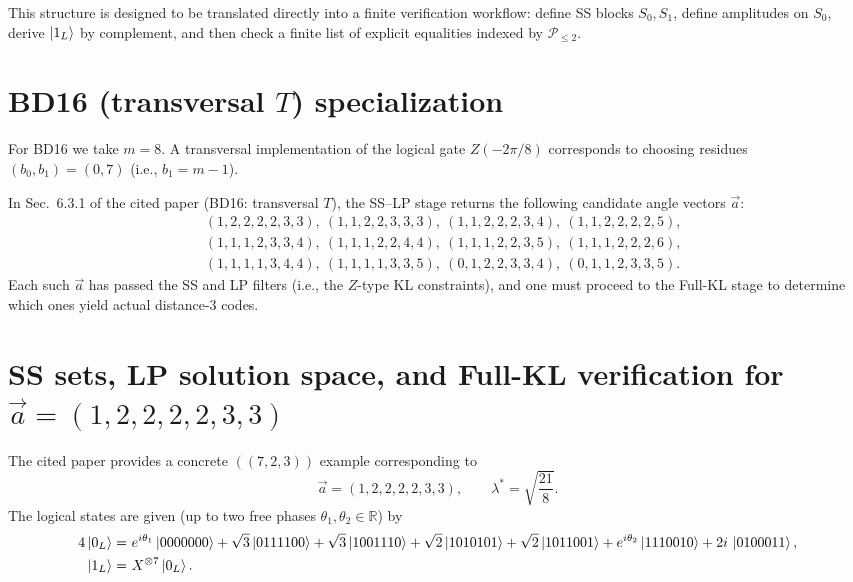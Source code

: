\documentclass[11pt]{article}
\begin{document}
\medskip
\noindent
This structure is designed to be translated directly into a finite verification workflow:
define SS blocks \(S_0,S_1\), define amplitudes on \(S_0\), derive \(\ket{1_L}\) by complement,
and then check a finite list of explicit equalities indexed by \(\mathcal{P}_{\le 2}\).

\section{BD16 (transversal \(T\)) specialization}

For BD16 we take \(m=8\). A transversal implementation of the logical gate \(Z(-2\pi/8)\) corresponds to choosing residues \((b_0,b_1)=(0,7)\) (i.e., \(b_1=m-1\)).

In Sec.~6.3.1 of the cited paper (BD16: transversal \(T\)), the SS--LP stage returns the following candidate angle vectors \(\vec a\):
\[
\begin{aligned}
&(1, 2, 2, 2, 2, 3, 3),\ (1, 1, 2, 2, 3, 3, 3),\ (1, 1, 2, 2, 2, 3, 4),\ (1, 1, 2, 2, 2, 2, 5),\\
&(1, 1, 1, 2, 3, 3, 4),\ (1, 1, 1, 2, 2, 4, 4),\ (1, 1, 1, 2, 2, 3, 5),\ (1, 1, 1, 2, 2, 2, 6),\\
&(1, 1, 1, 1, 3, 4, 4),\ (1, 1, 1, 1, 3, 3, 5),\ (0, 1, 2, 2, 3, 3, 4),\ (0, 1, 1, 2, 3, 3, 5).
\end{aligned}
\]
Each such \(\vec a\) has passed the SS and LP filters (i.e., the \(Z\)-type KL constraints), and one must proceed to the Full-KL stage to determine which ones yield actual distance-3 codes.


\section{SS sets, LP solution space, and Full-KL verification for $\vec a=(1,2,2,2,2,3,3)$}

The cited paper provides a concrete \(((7,2,3))\) example corresponding to
\[
\vec a=(1,2,2,2,2,3,3),
\qquad
\lambda^\ast=\sqrt{\frac{21}{8}}.
\]
The logical states are given (up to two free phases \(\theta_1,\theta_2\in\mathbb{R}\)) by
\[
\begin{aligned}
4\ket{0_L}
=&\ e^{i\theta_1}\ket{0000000}
+\sqrt{3}\ket{0111100}
+\sqrt{3}\ket{1001110}
+\sqrt{2}\ket{1010101}
+\sqrt{2}\ket{1011001}
+e^{i\theta_2}\ket{1110010}
+2i\,\ket{0100011},\\
\ket{1_L}=&\ X^{\otimes 7}\ket{0_L}.
\end{aligned}
\]
\end{document}
